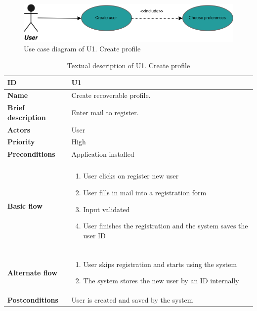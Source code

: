 \clearpage
\begin{figure}[hp]
	\includegraphics[width=\textwidth]{fig/U1}
	\centering
	\caption{Use case diagram of U1. Create profile}
	\label{Fig:U1}
\end{figure}

\begin{table}[hp]
	\renewcommand{\arraystretch}{1.5}
	\centering
	\caption{Textual description of U1. Create profile}
	\begin{tabular}[b]{|l | l|}\hline
		\textbf{ID} 				& U1									\\\hline
		\textbf{Name} 				& Create recoverable profile.			\\\hline
		\textbf{Brief description}	& Enter mail to register. 				\\\hline
		\textbf{Actors} 			& User									\\\hline
		\textbf{Priority}			& High									\\\hline
		\textbf{Preconditions}		& Application installed					\\\hline&\\[-2ex]
		\textbf{Basic flow}			& \begin{minipage}{5in}
									  \begin{enumerate}[noitemsep]
										\item User clicks on register new user
										\item User fills in mail into a registration form
										\item Input validated
										\item User finishes the registration and the system saves the user ID
									  \end{enumerate}						
									  \end{minipage}						\\\hline&\\[-2ex]
		\textbf{Alternate flow}		& \begin{minipage}{5in}
									  \begin{enumerate}[noitemsep]
										\item User skips registration and starts using the system
										\item The system stores the new user by an ID internally
									  \end{enumerate}
									 \end{minipage}							\\\hline
		\textbf{Postconditions}		& User is created and saved by the system\\\hline
	\end{tabular}
	\label{Tab:U1}
\end{table}

